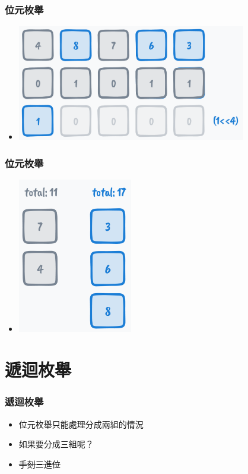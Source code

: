 \documentclass{beamer}
\begin{document}
\begin{frame}
    \frametitle{位元枚舉}
    \begin{itemize}
        \item \includegraphics[width=10.0cm]{img/img_9.png}
    \end{itemize}
\end{frame}

\begin{frame}
    \frametitle{位元枚舉}
    \begin{itemize}
        \item \includegraphics[width=5.0cm]{img/img_10.png}
    \end{itemize}
\end{frame}

\section{遞迴枚舉}

\begin{frame}
    \frametitle{遞迴枚舉}
    \begin{itemize}
        \item 位元枚舉只能處理分成兩組的情況
        \item 如果要分成三組呢？
        \vspace{0.5cm}
        \item<2-> \sout{手刻三進位}
    \end{itemize}
\end{frame}
\end{document}
